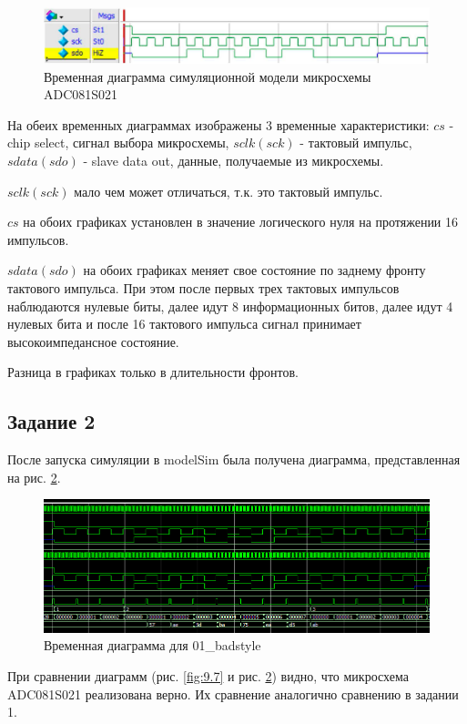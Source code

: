 \documentclass[a4paper,14pt]{article}
\begin{document}
	
	\begin{figure}[H]
		\centering
		\includegraphics[width=0.9\linewidth]{images/9_11}
		\caption{Временная диаграмма симуляционной модели микросхемы ADC081S021}
		\label{fig:9.11}
	\end{figure}

	На обеих временных диаграммах изображены 3 временные характеристики: $cs$ - chip select, сигнал выбора микросхемы, $sclk(sck)$ - тактовый импульс, $sdata(sdo)$ - slave data out, данные, получаемые из микросхемы.
	
	$sclk(sck)$ мало чем может отличаться, т.к. это тактовый импульс.
	
	$cs$ на обоих графиках установлен в значение логического нуля на протяжении 16 импульсов.
	
	$sdata(sdo)$ на обоих графиках меняет свое состояние по заднему фронту тактового импульса. При этом после первых трех тактовых импульсов наблюдаются нулевые биты, далее идут 8 информационных битов, далее идут 4 нулевых бита и после 16 тактового импульса сигнал принимает высокоимпедансное состояние.
	
	Разница в графиках только в длительности фронтов.	
		
	\subsection{Задание 2}

	После запуска симуляции в modelSim была получена диаграмма, представленная на рис. \ref{fig:z15msimwvf}.
	
	\begin{figure}[H]
		\centering
		\includegraphics[width=0.9\linewidth]{images/z1_5_msim_wvf}
		\caption{Временная диаграмма для 01\_badstyle}
		\label{fig:z15msimwvf}
	\end{figure}

	При сравнении диаграмм (рис. \ref{fig:9.7} и рис. \ref{fig:z15msimwvf}) видно, что микросхема ADC081S021 реализована верно. Их сравнение аналогично сравнению в задании 1.
	
\end{document}
